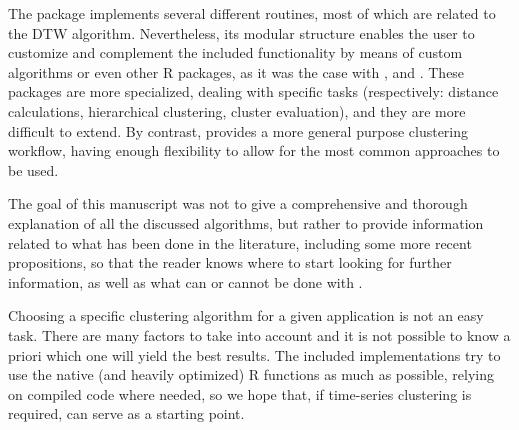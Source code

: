 The package implements several different routines,
most of which are related to the DTW algorithm.
Nevertheless, its modular structure enables the user to customize and complement the included functionality by means of custom algorithms or even other R packages,
as it was the case with ,  and .
These packages are more specialized, dealing with specific tasks
(respectively: distance calculations, hierarchical clustering, cluster evaluation),
and they are more difficult to extend.
By contrast, \dtwclust{} provides a more general purpose clustering workflow,
having enough flexibility to allow for the most common approaches to be used.

The goal of this manuscript was not to give a comprehensive and thorough explanation of all the discussed algorithms,
but rather to provide information related to what has been done in the literature,
including some more recent propositions,
so that the reader knows where to start looking for further information,
as well as what can or cannot be done with \dtwclust{}.

Choosing a specific clustering algorithm for a given application is not an easy task.
There are many factors to take into account and it is not possible to know a priori which one will yield the best results.
The included implementations try to use the native (and heavily optimized) R functions as much as possible,
relying on compiled code where needed,
so we hope that,
if time-series clustering is required,
\dtwclust{} can serve as a starting point.




\address{%
Alexis Sard\'a-Espinosa\\
\\
Disclaimer: The software package was developed\\
independently of any organization or institution\\
that is or has been associated with the author.
}
